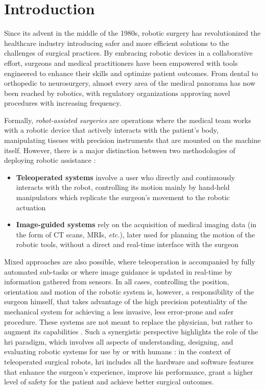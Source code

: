 \documentclass[../main.tex]{subfiles}
\begin{document}
\chapter{Introduction}
Since its advent in the middle of the 1980s, robotic surgery has revolutionized the healthcare industry introducing safer and more efficient solutions to the challenges of surgical practices. By embracing robotic devices in a collaborative effort, surgeons and medical practitioners have been empowered with tools engineered to enhance their skills and optimize patient outcomes. 
From dental to orthopedic to neurosurgery, almost every area of the medical panorama has now been reached by robotics, with regulatory organizations approving novel procedures with increasing frequency.

Formally, \textit{robot-assisted surgeries} are operations where the medical team works with a robotic device that actively interacts with the patient's body, manipulating tissues with precision instruments that are mounted on the machine itself. 
However, there is a major distinction between two methodologies of deploying robotic assistance \cite{Hoeckelmann2015}:
\begin{itemize}
    \item \textbf{Teleoperated systems} involve a user who directly and continuously interacts with the robot, controlling its motion mainly by hand-held manipulators which replicate the surgeon's movement to the robotic actuation
    \item \textbf{Image-guided systems} rely on the acquisition of medical imaging data (in the form of CT scans, MRIs, \textit{etc.}), later used for planning the motion of the robotic tools, without a direct and real-time interface with the surgeon
\end{itemize}
Mixed approaches are also possible, where teleoperation is accompanied by fully automated sub-tasks or where image guidance is updated in real-time by information gathered from sensors. 
In all cases, controlling the position, orientation and motion of the robotic system is, however, a responsibility of the surgeon himself, that takes advantage of the high precision potentiality of the mechanical system for achieving a less invasive, less error-prone and safer procedure. These systems are not meant to replace the physician, but rather to augment its capabilities \cite{Cleary2001}. Such a synergistic perspective highlights the role of the \ac{hri} paradigm, which involves all aspects of understanding, designing, and evaluating robotic systems for use by or with humans \cite{Goodrich2007}: in the context of teleoperated surgical robots, \ac{hri} includes all the hardware and software features that enhance the surgeon's experience, improve his performance, grant a higher level of safety for the patient and achieve better surgical outcomes.
\end{document}
